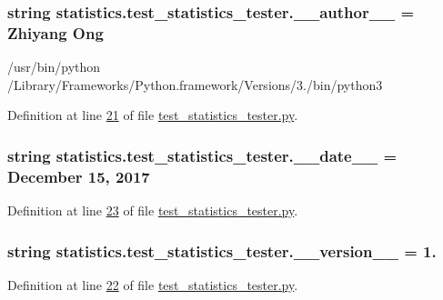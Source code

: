 \subsubsection[{\+\_\+\+\_\+author\+\_\+\+\_\+}]{\setlength{\rightskip}{0pt plus 5cm}string statistics.\+test\+\_\+statistics\+\_\+tester.\+\_\+\+\_\+author\+\_\+\+\_\+ = \textquotesingle{}Zhiyang Ong\textquotesingle{}}\label{namespacestatistics_1_1test__statistics__tester_ab9ecb1d5ecfb751c8b2a27ac138a0eed}


/usr/bin/python /\+Library/\+Frameworks/\+Python.framework/\+Versions/3./bin/python3 



Definition at line \hyperlink{test__statistics__tester_8py_source_l00021}{21} of file \hyperlink{test__statistics__tester_8py_source}{test\+\_\+statistics\+\_\+tester.\+py}.

\hypertarget{namespacestatistics_1_1test__statistics__tester_a0d2103581aebe4f7dfb05775432fa386}{}
\subsubsection[{\+\_\+\+\_\+date\+\_\+\+\_\+}]{\setlength{\rightskip}{0pt plus 5cm}string statistics.\+test\+\_\+statistics\+\_\+tester.\+\_\+\+\_\+date\+\_\+\+\_\+ = \textquotesingle{}December 15, 2017\textquotesingle{}}\label{namespacestatistics_1_1test__statistics__tester_a0d2103581aebe4f7dfb05775432fa386}


Definition at line \hyperlink{test__statistics__tester_8py_source_l00023}{23} of file \hyperlink{test__statistics__tester_8py_source}{test\+\_\+statistics\+\_\+tester.\+py}.

\hypertarget{namespacestatistics_1_1test__statistics__tester_a29677162e8392e196da563156d924f5d}{}
\subsubsection[{\+\_\+\+\_\+version\+\_\+\+\_\+}]{\setlength{\rightskip}{0pt plus 5cm}string statistics.\+test\+\_\+statistics\+\_\+tester.\+\_\+\+\_\+version\+\_\+\+\_\+ = \textquotesingle{}1.\textquotesingle{}}\label{namespacestatistics_1_1test__statistics__tester_a29677162e8392e196da563156d924f5d}


Definition at line \hyperlink{test__statistics__tester_8py_source_l00022}{22} of file \hyperlink{test__statistics__tester_8py_source}{test\+\_\+statistics\+\_\+tester.\+py}.

